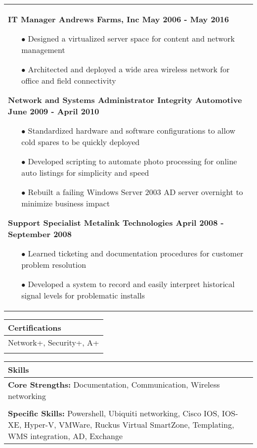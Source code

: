 \documentclass{article}
\begin{document}
\begin{tabular}{p{\dimexpr\linewidth-2\tabcolsep}}
  {\bfseries IT Manager \hfill Andrews Farms, Inc \qquad \qquad \qquad May 2006 - May 2016} 
 \begin{itemize}
	\item[$\bullet$]Designed a virtualized server space for content and network management
	\item[$\bullet$]Architected and deployed a wide area wireless network for office and field connectivity
  \end{itemize}
  {\bfseries Network and Systems Administrator \qquad Integrity Automotive \hfill June 2009 - April 2010}
 \begin{itemize}
	\item[$\bullet$]Standardized hardware and software configurations to allow cold spares to be quickly deployed
	\item[$\bullet$]Developed scripting to automate photo processing for online auto listings for simplicity and speed
	\item[$\bullet$]Rebuilt a failing Windows Server 2003 AD server overnight to minimize business impact
 \end{itemize}
   {\bfseries Support Specialist \hfill Metalink Technologies \quad \qquad April 2008 - September 2008}
 \begin{itemize}
 	\item[$\bullet$]Learned ticketing and documentation procedures for customer problem resolution
 	\item[$\bullet$]Developed a system to record and easily interpret historical signal levels for problematic installs
 \end{itemize}
\end{tabular}
\begin{tabular}{p{\dimexpr\linewidth-2\tabcolsep}}
	\textbf{Certifications} \\
	\hline
	\textnormal{Network+, Security+, A+} \\
	\\
\end{tabular}
\begin{tabular}{p{\dimexpr\linewidth-2\tabcolsep}}
	\textbf{Skills} \\
	\hline
	\textbf{Core Strengths:} \textnormal{Documentation, Communication, Wireless networking} \\
	\\
	\textbf{Specific Skills:} \textnormal{Powershell, Ubiquiti networking, Cisco IOS, IOS-XE, Hyper-V, VMWare, Ruckus Virtual SmartZone, Templating, WMS integration, AD, Exchange}
\end{tabular}
\end{document}
